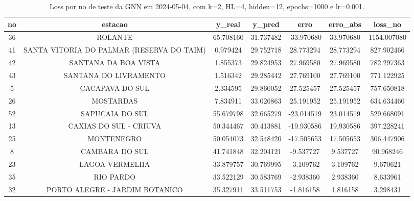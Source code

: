 \begin{table}[h]
\centering
\caption{Loss por no de teste da GNN em 2024-05-04, com k=2, HL=4, hidden=12, epochs=1000 e lr=0.001.}
\label{tab:gnn_loss_k2_hl4_h12_e1000_d20240504}
\begin{tabular}{ccccccc}
\toprule
no & estacao & y\_real & y\_pred & erro & erro\_abs & loss\_no \\
\midrule
36 & ROLANTE & 65.708160 & 31.737482 & -33.970680 & 33.970680 & 1154.007080 \\
41 & SANTA VITORIA DO PALMAR (RESERVA DO TAIM) & 0.979424 & 29.752718 & 28.773294 & 28.773294 & 827.902466 \\
42 & SANTANA DA BOA VISTA & 1.855373 & 29.824953 & 27.969580 & 27.969580 & 782.297363 \\
43 & SANTANA DO LIVRAMENTO & 1.516342 & 29.285442 & 27.769100 & 27.769100 & 771.122925 \\
5 & CACAPAVA DO SUL & 2.334595 & 29.860052 & 27.525457 & 27.525457 & 757.650818 \\
26 & MOSTARDAS & 7.834911 & 33.026863 & 25.191952 & 25.191952 & 634.634460 \\
52 & SAPUCAIA DO SUL & 55.679798 & 32.665279 & -23.014519 & 23.014519 & 529.668091 \\
13 & CAXIAS DO SUL - CRIUVA & 50.344467 & 30.413881 & -19.930586 & 19.930586 & 397.228241 \\
25 & MONTENEGRO & 50.054073 & 32.548420 & -17.505653 & 17.505653 & 306.447906 \\
8 & CAMBARA DO SUL & 41.741848 & 32.204121 & -9.537727 & 9.537727 & 90.968246 \\
23 & LAGOA VERMELHA & 33.879757 & 30.769995 & -3.109762 & 3.109762 & 9.670621 \\
35 & RIO PARDO & 33.522129 & 30.583769 & -2.938360 & 2.938360 & 8.633961 \\
32 & PORTO ALEGRE - JARDIM BOTANICO & 35.327911 & 33.511753 & -1.816158 & 1.816158 & 3.298431 \\
\bottomrule
\end{tabular}
\end{table}
